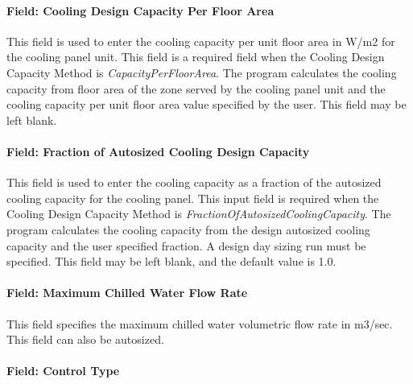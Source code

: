 \paragraph{Field: Cooling Design Capacity Per Floor Area}\label{field-cooling-design-capacity-per-floor-area-2}

This field is used to enter the cooling capacity per unit floor area in W/m2 for the cooling panel unit. This field is a required field when the Cooling Design Capacity Method is \emph{CapacityPerFloorArea}. The program calculates the cooling capacity from floor area of the zone served by the cooling panel unit and the cooling capacity per unit floor area value specified by the user. This field may be left blank.

\paragraph{Field: Fraction of Autosized Cooling Design Capacity}\label{field-fraction-of-autosized-cooling-design-capacity-2}

This field is used to enter the cooling capacity as a fraction of the autosized cooling capacity for the cooling panel. This input field is required when the Cooling Design Capacity Method is \emph{FractionOfAutosizedCoolingCapacity}. The program calculates the cooling capacity from the design autosized cooling capacity and the user specified fraction. A design day sizing run must be specified. This field may be left blank, and the default value is 1.0.

\paragraph{Field: Maximum Chilled Water Flow Rate}\label{field-maximum-chilled-water-flow-rate}

This field specifies the maximum chilled water volumetric flow rate in m3/sec.  This field can also be autosized.

\paragraph{Field: Control Type}

